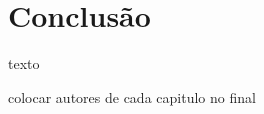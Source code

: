 \section{Conclusão} \label{section: introduction}
texto
\par\vspace{6pt}
colocar autores de cada capitulo no final